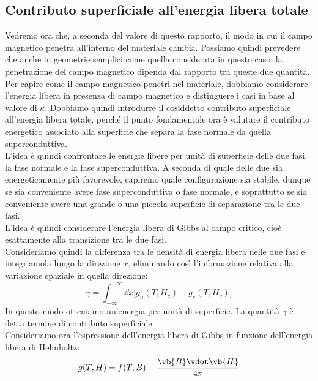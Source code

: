 \subsection{Contributo superficiale all'energia libera totale}
Vedremo ora che, a seconda del valore di questo rapporto, il modo in cui il campo magnetico penetra all'interno del materiale cambia. Possiamo quindi prevedere che anche in geometrie semplici come quella considerata in questo caso, la penetrazione del campo magnetico dipenda dal rapporto tra queste due quantità.\\
Per capire come il campo magnetico penetri nel materiale, dobbiamo considerare l'energia libera in presenza di campo magnetico e distinguere i casi in base al valore di $\kappa$. Dobbiamo quindi introdurre il cosiddetto contributo superficiale all'energia libera totale, perché il punto fondamentale ora è valutare il contributo energetico associato alla superficie che separa la fase normale da quella superconduttiva.\\
L'idea è quindi confrontare le energie libere per unità di superficie delle due fasi, la fase normale e la fase superconduttiva. A seconda di quale delle due sia energeticamente più favorevole, capiremo quale configurazione sia stabile, dunque se sia conveniente avere fase superconduttiva o fase normale, e soprattutto se sia conveniente avere una grande o una piccola superficie di separazione tra le due fasi.\\
L'idea è quindi considerare l'energia libera di Gibbs al campo critico, cioè esattamente alla transizione tra le due fasi. \\
Consideriamo quindi la differenza tra le densità di energia libera nelle due fasi e integriamola lungo la direzione $x$, eliminando così l'informazione relativa alla variazione spaziale in quella direzione:
\begin{equation*}
   \gamma
   = \int_{-\infty}^{+\infty} \dd{x}
   \bigl[ g_n(T, H_c) - g_s(T, H_c) \bigr]
\end{equation*}
In questo modo otteniamo un'energia per unità di superficie. La quantità $\gamma$ è detta termine di contributo superficiale.\\
Consideriamo ora l'espressione dell'energia libera di Gibbs in funzione dell'energia libera di Helmholtz:
\begin{equation}
   g(T, H)
   = f(T, B) - \frac{\vb{B} \vdot \vb{H}}{4\pi}
   \label{eq:relazione_gibbs_helmholtz}
\end{equation}

